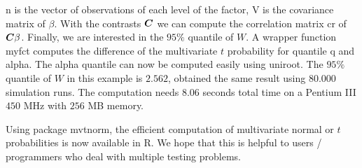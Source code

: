 \documentclass[11pt]{amsart}
\newcommand{\C}{\mbox{\boldmath $C$}}
\begin{document}
{\ttfamily n} is the vector of observations of each level of the factor,
{\ttfamily V} is the covariance matrix of $ \beta $. With the contrasts $ \C
$ we can compute the correlation matrix {\ttfamily cr} 
of $ \C\beta $. Finally, we are
interested in the $ 95\%$ quantile of $ W $. A wrapper function {\ttfamily
myfct} computes the difference of the multivariate $ t $ probability for
quantile {\ttfamily q} and {\ttfamily alpha}. The {\ttfamily alpha} quantile 
can now be computed easily
using {\ttfamily uniroot}. The $95\%$ quantile of $ W $ in this example is $
2.562 $, \cite{the-effici:1987} obtained the same result using $ 80.000 $
simulation runs. The computation needs $ 8.06 $ seconds total time on a 
Pentium III $450$ MHz with $256$ MB memory.

Using package {\ttfamily mvtnorm}, the efficient computation of 
multivariate normal or $ t $ probabilities is now available 
in {\ttfamily R}. We hope that this is helpful to users / programmers who
deal with multiple testing problems. 



\end{document}
